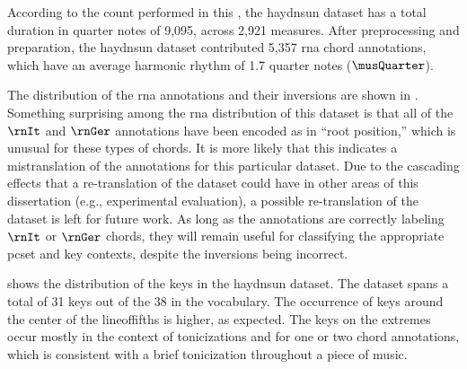 
According to the count performed in this \thesisdiss{}, the
\gls{haydnsun} dataset has a total duration in quarter notes
of 9,095, across 2,921 measures. After preprocessing and
preparation, the \gls{haydnsun} dataset contributed 5,357
\gls{rna} chord annotations, which have an average harmonic
rhythm of 1.7 quarter notes ($\musQuarter$).

The distribution of the \gls{rna} annotations and their
inversions are shown in .
Something surprising among the \gls{rna} distribution of
this dataset is that all of the $\rnIt$ and $\rnGer$
annotations have been encoded as in ``root position,'' which
is unusual for these types of chords. It is more likely that
this indicates a mistranslation of the annotations for this
particular dataset. Due to the cascading effects that a
re-translation of the dataset could have in other areas of
this dissertation (e.g., experimental evaluation), a
possible re-translation of the dataset is left for future
work. As long as the annotations are correctly labeling
$\rnIt$ or $\rnGer$ chords, they will remain useful for
classifying the appropriate \gls{pcset} and key contexts,
despite the inversions being incorrect.



 shows the distribution of the
keys in the \gls{haydnsun} dataset. The dataset spans a
total of 31 keys out of the 38 in the vocabulary. The
occurrence of keys around the center of the
\gls{lineoffifths} is higher, as expected. The keys on the
extremes occur mostly in the context of tonicizations and
for one or two chord annotations, which is consistent with a
brief tonicization throughout a piece of music.
